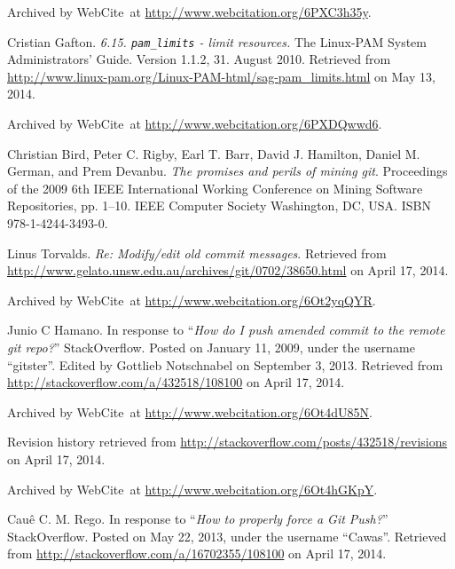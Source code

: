 \begin{thebibliography}{9}
Archived by WebCite\textsuperscript{\textregistered}\ at
\url{http://www.webcitation.org/6PXC3h35y}.


Cristian Gafton. \emph{6.15. \texttt{pam\_limits} - limit resources.} The
Linux-PAM System Administrators' Guide. Version 1.1.2, 31. August 2010.
Retrieved from
\url{http://www.linux-pam.org/Linux-PAM-html/sag-pam_limits.html} on May 13,
2014.

Archived by WebCite\textsuperscript{\textregistered}\ at
\url{http://www.webcitation.org/6PXDQwwd6}.


Christian Bird, Peter C. Rigby, Earl T. Barr, David J. Hamilton, Daniel M.
German, and Prem Devanbu. \emph{The promises and perils of mining git}.
Proceedings of the 2009 6th IEEE International Working Conference on Mining
Software Repositories, pp. 1--10. IEEE Computer Society Washington, DC, USA.
ISBN 978-1-4244-3493-0.


Linus Torvalds. \emph{Re: Modify/edit old commit messages}. Retrieved from
\url{http://www.gelato.unsw.edu.au/archives/git/0702/38650.html} on April 17,
2014.

Archived by WebCite\textsuperscript{\textregistered}\ at
\url{http://www.webcitation.org/6Ot2yqQYR}.


Junio C Hamano. In response to ``\emph{How do I push amended commit to the remote
git repo?}'' StackOverflow. Posted on January 11, 2009, under the username
``gitster''. Edited by Gottlieb Notschnabel on September 3, 2013. Retrieved
from \url{http://stackoverflow.com/a/432518/108100} on April 17, 2014.

Archived by WebCite\textsuperscript{\textregistered}\ at
\url{http://www.webcitation.org/6Ot4dU85N}.

Revision history retrieved from
\url{http://stackoverflow.com/posts/432518/revisions} on April 17, 2014.

Archived by WebCite\textsuperscript{\textregistered}\ at
\url{http://www.webcitation.org/6Ot4hGKpY}.


Cauê C. M. Rego. In response to ``\emph{How to properly force a Git Push?}''
StackOverflow. Posted on May 22, 2013, under the username ``Cawas''.  Retrieved
from \url{http://stackoverflow.com/a/16702355/108100} on April 17, 2014.


\end{thebibliography}
